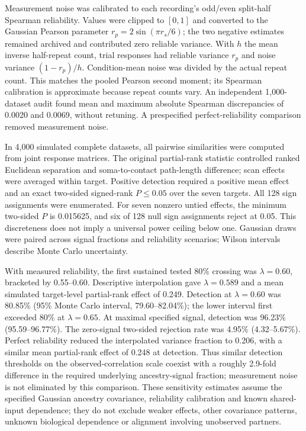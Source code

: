 Measurement noise was calibrated to each recording's odd/even split-half Spearman reliability. Values were clipped to $[0,1]$ and converted to the Gaussian Pearson parameter $r_p=2\sin(\pi r_s/6)$; the two negative estimates remained archived and contributed zero reliable variance. With $h$ the mean inverse half-repeat count, trial responses had reliable variance $r_p$ and noise variance $(1-r_p)/h$. Condition-mean noise was divided by the actual repeat count. This matches the pooled Pearson second moment; its Spearman calibration is approximate because repeat counts vary. An independent 1,000-dataset audit found mean and maximum absolute Spearman discrepancies of 0.0020 and 0.0069, without retuning. A prespecified perfect-reliability comparison removed measurement noise.

In 4,000 simulated complete datasets, all pairwise similarities were computed from joint response matrices. The original partial-rank statistic controlled ranked Euclidean separation and soma-to-contact path-length difference; scan effects were averaged within target. Positive detection required a positive mean effect and an exact two-sided signed-rank $P\leq0.05$ over the seven targets. All 128 sign assignments were enumerated. For seven nonzero untied effects, the minimum two-sided $P$ is 0.015625, and six of 128 null sign assignments reject at 0.05. This discreteness does not imply a universal power ceiling below one. Gaussian draws were paired across signal fractions and reliability scenarios; Wilson intervals describe Monte Carlo uncertainty.

With measured reliability, the first sustained tested 80\% crossing was $\lambda=0.60$, bracketed by 0.55--0.60. Descriptive interpolation gave $\lambda=0.589$ and a mean simulated target-level partial-rank effect of 0.249. Detection at $\lambda=0.60$ was 80.85\% (95\% Monte Carlo interval, 79.60--82.04\%); the lower interval first exceeded 80\% at $\lambda=0.65$. At maximal specified signal, detection was 96.23\% (95.59--96.77\%). The zero-signal two-sided rejection rate was 4.95\% (4.32--5.67\%). Perfect reliability reduced the interpolated variance fraction to 0.206, with a similar mean partial-rank effect of 0.248 at detection. Thus similar detection thresholds on the observed-correlation scale coexist with a roughly 2.9-fold difference in the required underlying ancestry-signal fraction; measurement noise is not eliminated by this comparison. These sensitivity estimates assume the specified Gaussian ancestry covariance, reliability calibration and known shared-input dependence; they do not exclude weaker effects, other covariance patterns, unknown biological dependence or alignment involving unobserved partners.

